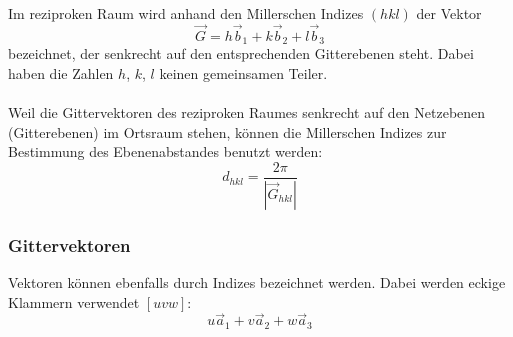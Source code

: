 \documentclass[a4paper,titlepage]{scrartcl}
\numberwithin{equation}{section}
\begin{document}
Im reziproken Raum wird anhand den Millerschen Indizes $(hkl)$ der Vektor
\begin{equation*}
\vec{G}=h \vec{b}_1+k \vec{b}_2+l \vec{b}_3
\end{equation*}
bezeichnet, der senkrecht auf den entsprechenden Gitterebenen steht. Dabei haben die Zahlen $h$, $k$, $l$ keinen gemeinsamen Teiler.\\ \\
Weil die Gittervektoren des reziproken Raumes senkrecht auf den Netzebenen (Gitterebenen) im Ortsraum stehen, können die Millerschen Indizes zur Bestimmung des Ebenenabstandes benutzt werden:
\begin{equation*}
d_{hkl}=\frac{2 \pi}{|\vec{G}_{hkl}|}
\end{equation*}
\subsubsection{Gittervektoren}
Vektoren können ebenfalls durch Indizes bezeichnet werden. Dabei werden eckige Klammern verwendet $[uvw]$:
\begin{equation*}
u\vec{a}_1+v\vec{a}_2+w\vec{a}_3
\end{equation*}
\end{document}
